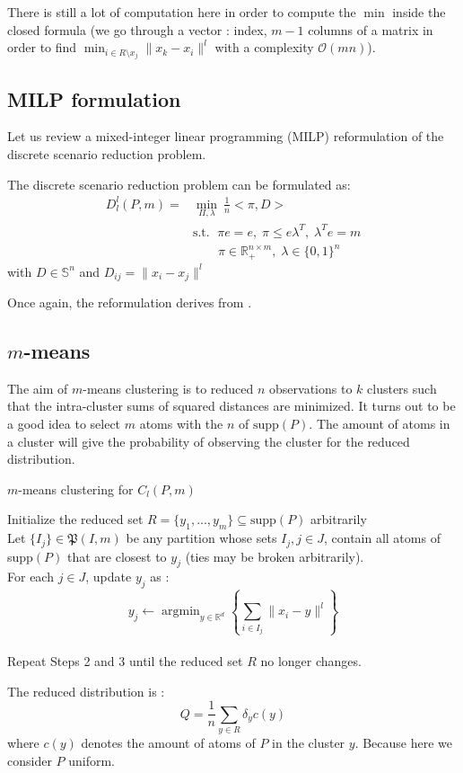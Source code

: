 \documentclass{amsart}
\newcommand{\argmin}{\mathop{\arg\min}}
\newcommand{\RR}{\mathbb{R}}
\begin{document}
There is still a lot of computation here in order to compute the $\min$ inside the closed formula (we go through a vector : index, $m-1$ columns of a matrix in order to find $\min_{i\in R\setminus x_j}\lVert x_k-x_i\rVert^l$ with a complexity $\mathcal{O}\left(mn\right)$). 

\subsection{MILP formulation}
Let us review a mixed-integer linear programming (MILP) reformulation of the discrete scenario reduction problem.
\begin{theorem}
The discrete scenario reduction problem can be formulated as: 
\begin{align*}
    D_l^l\left(P,m\right)=&\min_{\Pi,\lambda}\:\frac{1}{n}<\pi,D> \\ &\text{s.t. } \;\pi e=e, \; \pi \leq e\lambda^T,\; \lambda^Te=m\\&\quad\quad \pi\in\RR^{n\times m}_+, \; \lambda\in\{0,1\}^n
    \end{align*}
    with $D\in \mathbb{S}^n$ and $D_{ij}=\lVert x_i-x_j\rVert^l$
\end{theorem}
\begin{remark}
    Once again, the reformulation derives from .
\end{remark}
\subsection{$m$-means}
The aim of $m$-means clustering is to reduced $n$ observations to $k$ clusters such that the intra-cluster sums of squared distances are minimized. It turns out to be a good idea to select $m$ atoms with the $n$ of $\text{supp}\left(P\right)$. The amount of atoms in a cluster will give the probability of observing the cluster for the reduced distribution.

\begin{algorithm}
    \caption{$m$-means clustering for $C_l\left(P,m\right)$}\label{k m}
    Initialize the reduced set $R=\{y_1,...,y_m\} \subseteq \text{supp}\left(P\right)$ arbitrarily \\ Let $\{I_j\}\in\mathfrak{P}\left(I,m\right)$ be any partition whose sets $I_j, j\in J$, contain all atoms of supp$\left(P\right)$ that are closest to $y_j$ (ties may be broken arbitrarily). \\ For each $j\in J$, update $y_j$ as : $$y_j \gets \argmin_{y\in\RR^d} \left\{ \sum_{i\in I_j}\lVert x_i-y\rVert^l\right\}$$ \\ Repeat Steps 2 and 3 until the reduced set $R$ no longer changes.
\end{algorithm}
The reduced distribution is :
$$
Q=\frac{1}{n}\sum_{y\in R}\delta_{y}c\left(y\right)
$$
where $ c\left(y\right)$ denotes the amount of atoms of $P$ in the cluster $y$. Because here we consider $P$ uniform.
\end{document}
